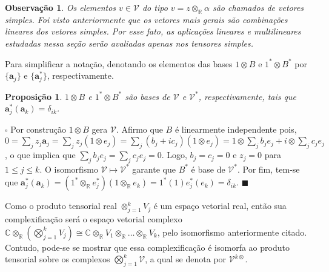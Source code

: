 \documentclass[12pt]{book}
\newtheorem{observacao}[teorema]{Observação}
\newtheorem{proposicao}[teorema]{Proposição}
\newenvironment{prova}[1]{$\square$ #1}{\hfill$\blacksquare$}
\newcommand{\complexificacaotensorial}[1]{\complexo{}\otimes_{\reta} #1}
\newcommand{\complexificado}[1]{\mathcal{#1}}
\newcommand{\complexificacaoelemento}[2]{#1\otimes_{\reta} #2}
\newcommand{\complexo}[1]{\mathbb{C}^{#1}}
\newcommand{\produtotensorialreal}[2]{\bigotimes_{j=1}^{#1} #2_{j}}
\newcommand{\real}[1]{\mathbb{R}^{#1}}
\newcommand{\reta}{\real{}}
\begin{document}
	
	\begin{observacao}
		Os elementos $v \in \complexificado{V}$ do tipo $v = \complexificacaoelemento{z}{\alpha}$ são chamados de vetores simples. Foi visto anteriormente que os vetores mais gerais são combinações lineares dos vetores simples. Por esse fato, as aplicações lineares e multilineares estudadas nessa seção serão avaliadas apenas nos tensores simples.
	\end{observacao}
	
	Para simplificar a notação, denotando os elementos das bases $1\otimes B$ e $1^{*}\otimes B^{*}$ por $\{\textbf{a}_{j}\} $ e $\{\textbf{a}^{*}_{j}\}$, respectivamente.
	
	\begin{proposicao}\label{proposicao_base_complexificada}
		$1\otimes B$ e $1^{*}\otimes B^{*}$ são bases de $\complexificado{V}$ e $\complexificado{V}^{*}$, respectivamente, tais que $\textbf{a}^{*}_{j}(\textbf{a}_{k})=\delta_{ik}$.
	\end{proposicao}
	\begin{prova}
		Por construção $1\otimes B$ gera $\complexificado{V}$. Afirmo que $B$ é linearmente independente pois, $0=\sum_{j}z_{j}\textbf{a}_{j} = \sum_{j}z_{j}(1\otimes e_{j}) = \sum_{j}(b_{j} +ic_{j})(1\otimes e_{j}) = 1\otimes \sum_{j}b_{j}e_{j}+i\otimes \sum_{j}c_{j}e_{j}$, o que implica que $\sum_{j}b_{j}e_{j}=\sum_{j}c_{j}e_{j} = 0$. Logo, $b_{j}=c_{j}=0$  e $z_{j} = 0$ para $1\leq j\leq k$. O isomorfismo $\complexificado{V} \mapsto \complexificado{V}^{*}$ garante que $B^{*}$ é base de $\complexificado{V}^{*}$. Por fim, tem-se que $\textbf{a}^{*}_{j}(\textbf{a}_{k})=(\complexificacaoelemento{1^{*}}{e^{*}_{j}})(\complexificacaoelemento{1}{e_{k}}) = 1^{*}(1)e^{*}_{j}(e_{k}) = \delta_{ik}$.
	\end{prova}
	
	Como o produto tensorial real $\otimes_{j=1}^{k}V_{j}$ é um espaço vetorial real, então sua complexificação será o espaço vetorial complexo $\complexificacaotensorial{(\produtotensorialreal{k}{V})} \cong \complexificacaotensorial{V_{1} \otimes_{\reta} \dots \otimes_{\reta} V_{k}}$, pelo isomorfismo anteriormente citado. Contudo, pode-se se mostrar que essa complexificação é isomorfa ao produto tensorial sobre os complexos $\bigotimes^{k}_{j=1}\complexificado{V}$, a qual se denota por $\complexificado{V}^{k\otimes}$. 
	
\end{document}
